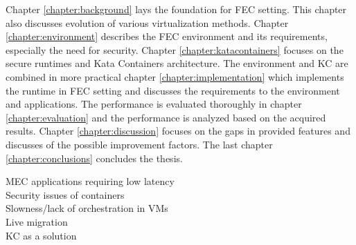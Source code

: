 Chapter \ref{chapter:background} lays the foundation for FEC setting. This chapter also discusses evolution of various virtualization methods. Chapter \ref{chapter:environment} describes the FEC environment and its requirements, especially the need for security. Chapter \ref{chapter:katacontainers} focuses on the secure runtimes and Kata Containers architecture. The environment and KC are combined in more practical chapter \ref{chapter:implementation} which implements the runtime in FEC setting and discusses the requirements to the environment and applications. The performance is evaluated thoroughly in chapter \ref{chapter:evaluation} and the performance is analyzed based on the acquired results. Chapter \ref{chapter:discussion} focuses on the gaps in provided features and discusses of the possible improvement factors. The last chapter \ref{chapter:conclusions} concludes the thesis.

MEC applications requiring low latency \\
Security issues of containers \\
Slowness/lack of orchestration in VMs \\
Live migration \\
KC as a solution \\


